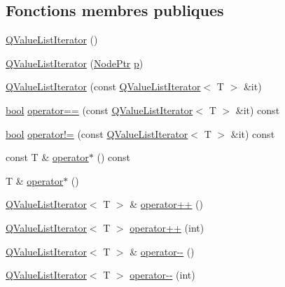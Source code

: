 \subsection*{Fonctions membres publiques}
\begin{DoxyCompactItemize}
\item 
\hyperlink{class_q_value_list_iterator_adc014e4e90024a0a1eb42a93247de28f}{Q\+Value\+List\+Iterator} ()
\item 
\hyperlink{class_q_value_list_iterator_a4e7ece7c4d1853257e5e31686951a1ff}{Q\+Value\+List\+Iterator} (\hyperlink{class_q_value_list_iterator_abf409d04d86ddd5977132fecb2e6db61}{Node\+Ptr} \hyperlink{060__command__switch_8tcl_a15229b450f26d8fa1c10bea4f3279f4d}{p})
\item 
\hyperlink{class_q_value_list_iterator_a7651a3d207366005b664f05589c730c4}{Q\+Value\+List\+Iterator} (const \hyperlink{class_q_value_list_iterator}{Q\+Value\+List\+Iterator}$<$ T $>$ \&it)
\item 
\hyperlink{qglobal_8h_a1062901a7428fdd9c7f180f5e01ea056}{bool} \hyperlink{class_q_value_list_iterator_ac77f5906676f1571dbf0f97bf910309f}{operator==} (const \hyperlink{class_q_value_list_iterator}{Q\+Value\+List\+Iterator}$<$ T $>$ \&it) const 
\item 
\hyperlink{qglobal_8h_a1062901a7428fdd9c7f180f5e01ea056}{bool} \hyperlink{class_q_value_list_iterator_a8a6a39f112b613ac2bbefd691d6ddc99}{operator!=} (const \hyperlink{class_q_value_list_iterator}{Q\+Value\+List\+Iterator}$<$ T $>$ \&it) const 
\item 
const T \& \hyperlink{class_q_value_list_iterator_a67ce5529e023382790a3951c1d0dda01}{operator$\ast$} () const 
\item 
T \& \hyperlink{class_q_value_list_iterator_ab5b820dd99c29c8ffbe68cac907ab47c}{operator$\ast$} ()
\item 
\hyperlink{class_q_value_list_iterator}{Q\+Value\+List\+Iterator}$<$ T $>$ \& \hyperlink{class_q_value_list_iterator_a7992e5edc84b985360ea4340a32d3aef}{operator++} ()
\item 
\hyperlink{class_q_value_list_iterator}{Q\+Value\+List\+Iterator}$<$ T $>$ \hyperlink{class_q_value_list_iterator_a01a629072be79007df6c6ff48c0a0af2}{operator++} (int)
\item 
\hyperlink{class_q_value_list_iterator}{Q\+Value\+List\+Iterator}$<$ T $>$ \& \hyperlink{class_q_value_list_iterator_a41feb1058f0098416ec83c7a6bcd019b}{operator-\/-\/} ()
\item 
\hyperlink{class_q_value_list_iterator}{Q\+Value\+List\+Iterator}$<$ T $>$ \hyperlink{class_q_value_list_iterator_ab9d27d1e7b824abfb485ac85ac7c5f85}{operator-\/-\/} (int)
\end{DoxyCompactItemize}
